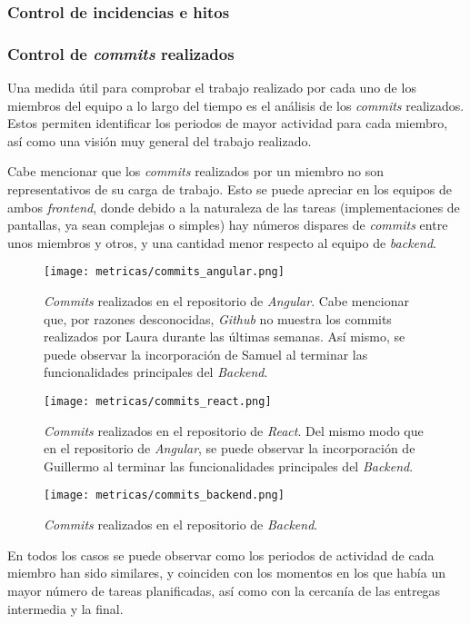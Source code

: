 \documentclass[11pt, a4paper, titlepage]{article}
\begin{document}
\subsubsection{Control de incidencias e hitos} %

\subsubsection{Control de \textit{commits} realizados}
Una medida útil para comprobar el trabajo realizado por cada uno de los miembros del equipo a lo largo del tiempo es el análisis de los \textit{commits} realizados. Estos permiten identificar los periodos de mayor actividad para cada miembro, así como una visión muy general del trabajo realizado. 

Cabe mencionar que los \textit{commits} realizados por un miembro no son representativos de su carga de trabajo. Esto se puede apreciar en los equipos de ambos \textit{frontend}, donde debido a la naturaleza de las tareas (implementaciones de pantallas, ya sean complejas o simples) hay números dispares de \textit{commits} entre unos miembros y otros, y una cantidad menor respecto al equipo de \textit{backend}.

\begin{figure}[!h]
    \centering
    \texttt{[image: metricas/commits\_angular.png]}
    \caption{\textit{Commits} realizados en el repositorio de \textit{Angular}. Cabe mencionar que, por razones desconocidas, \textit{Github} no muestra los commits realizados por Laura durante las últimas semanas. Así mismo, se puede observar la incorporación de Samuel al terminar las funcionalidades principales del \textit{Backend}.}
    \label{fig:my_label}
\end{figure}

\begin{figure}[!h]
    \centering
    \texttt{[image: metricas/commits\_react.png]}
    \caption{\textit{Commits} realizados en el repositorio de \textit{React}. Del mismo modo que en el repositorio de \textit{Angular}, se puede observar la incorporación de Guillermo al terminar las funcionalidades principales del \textit{Backend}.}
    \label{fig:my_label}
\end{figure}

\begin{figure}[!h]
    \centering
    \texttt{[image: metricas/commits\_backend.png]}
    \caption{\textit{Commits} realizados en el repositorio de \textit{Backend}.}
    \label{fig:my_label}
\end{figure}
\FloatBarrier
En todos los casos se puede observar como los periodos de actividad de cada miembro han sido similares, y coinciden con los momentos en los que había un mayor número de tareas planificadas, así como con la cercanía de las entregas intermedia y la final.
\end{document}
